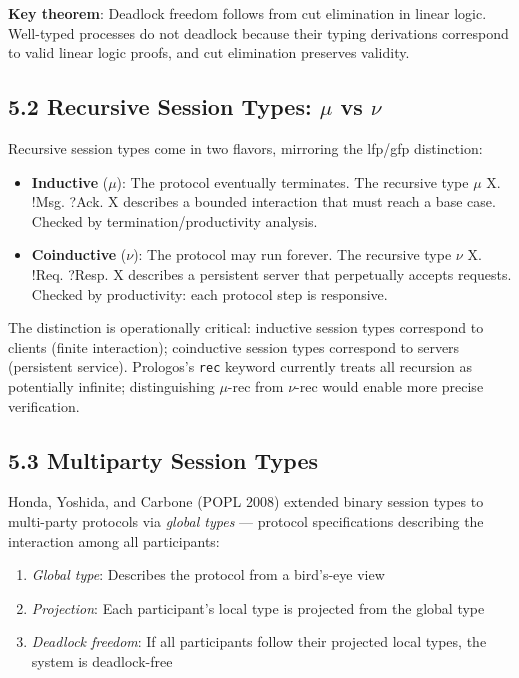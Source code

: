 \documentclass[11pt]{article}
\begin{document}
\textbf{Key theorem}: Deadlock freedom follows from cut elimination in linear logic.
Well-typed processes do not deadlock because their typing derivations correspond
to valid linear logic proofs, and cut elimination preserves validity.
\subsection{5.2 Recursive Session Types: \(\mu\) vs \(\nu\)}
\label{sec:org3b4aec7}

Recursive session types come in two flavors, mirroring the lfp/gfp distinction:

\begin{itemize}
\item \textbf{Inductive} (\(\mu\)): The protocol eventually terminates. The recursive type
\(\mu\) X. !Msg. ?Ack. X describes a bounded interaction that must reach a
base case. Checked by termination/productivity analysis.

\item \textbf{Coinductive} (\(\nu\)): The protocol may run forever. The recursive type
\(\nu\) X. !Req. ?Resp. X describes a persistent server that perpetually accepts
requests. Checked by productivity: each protocol step is responsive.
\end{itemize}

The distinction is operationally critical: inductive session types correspond
to clients (finite interaction); coinductive session types correspond to
servers (persistent service). Prologos's \texttt{rec} keyword currently treats all
recursion as potentially infinite; distinguishing \(\mu\)-rec from \(\nu\)-rec would
enable more precise verification.
\subsection{5.3 Multiparty Session Types}
\label{sec:org079acd3}

Honda, Yoshida, and Carbone (POPL 2008) extended binary session types to
multi-party protocols via \emph{global types} --- protocol specifications describing
the interaction among all participants:

\begin{enumerate}
\item \emph{Global type}: Describes the protocol from a bird's-eye view
\item \emph{Projection}: Each participant's local type is projected from the global type
\item \emph{Deadlock freedom}: If all participants follow their projected local types,
the system is deadlock-free
\end{enumerate}
\end{document}
